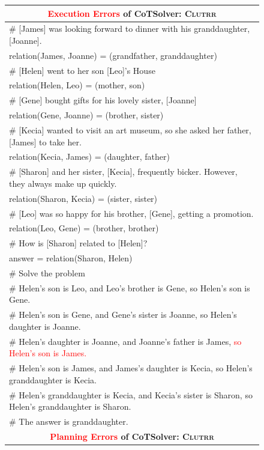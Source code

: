 \documentclass{article}
\theoremstyle{definition}
\newcommand{\clutrr}{\textsc{Clutrr}}
\begin{document}
\begin{figure}[h]
    \footnotesize
    \centering
    \begin{tabularx}{\linewidth}{X}
    \toprule
            \multicolumn{1}{c}{\bf \textcolor{red}{Execution Errors} of {\sc CoTSolver}: \clutrr{}} \\
         \midrule
    \# [James] was looking forward to dinner with his granddaughter, [Joanne].\\
    relation(James, Joanne) = (grandfather, granddaughter)\\
    \# [Helen] went to her son [Leo]'s House\\
    relation(Helen, Leo) = (mother, son)\\
    \# [Gene] bought gifts for his lovely sister, [Joanne]\\
    relation(Gene, Joanne) = (brother, sister)\\
    \# [Kecia] wanted to visit an art museum, so she asked her father, [James] to take her.\\
    relation(Kecia, James) = (daughter, father)\\
    \# [Sharon] and her sister, [Kecia], frequently bicker. However, they always make up quickly.\\
    relation(Sharon, Kecia) = (sister, sister)\\
    \# [Leo] was so happy for his brother, [Gene], getting a promotion.\\
    relation(Leo, Gene) = (brother, brother)\\
    \# How is [Sharon] related to [Helen]?\\
    answer = relation(Sharon, Helen)\\
    \# Solve the problem\\
    \# Helen's son is Leo, and Leo's brother is Gene, so Helen's son is Gene.\\
    \# Helen's son is Gene, and Gene's sister is Joanne, so Helen's daughter is Joanne.\\
    \# Helen's daughter is Joanne, and Joanne's father is James, \textcolor{red}{so Helen's son is James.}\\
    \# Helen's son is James, and James's daughter is Kecia, so Helen's granddaughter is Kecia.\\
    \# Helen's granddaughter is Kecia, and Kecia's sister is Sharon, so Helen's granddaughter is Sharon.\\
    \# The answer is granddaughter.\\
    \midrule
       \multicolumn{1}{c}{\bf \textcolor{red}{Planning Errors} of {\sc CoTSolver}:  \clutrr{}}   \\

\end{tabularx}
\end{figure}
\end{document}
